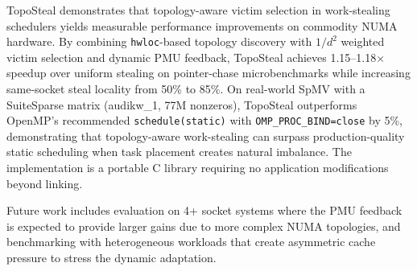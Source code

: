 \documentclass[conference]{IEEEtran}
\begin{document}
TopoSteal demonstrates that topology-aware victim selection in work-stealing schedulers yields measurable performance improvements on commodity NUMA hardware. By combining \texttt{hwloc}-based topology discovery with $1/d^2$ weighted victim selection and dynamic PMU feedback, TopoSteal achieves 1.15--1.18$\times$ speedup over uniform stealing on pointer-chase microbenchmarks while increasing same-socket steal locality from 50\% to 85\%. On real-world SpMV with a SuiteSparse matrix (audikw\_1, 77M nonzeros), TopoSteal outperforms OpenMP's recommended \texttt{schedule(static)} with \texttt{OMP\_PROC\_BIND=close} by 5\%, demonstrating that topology-aware work-stealing can surpass production-quality static scheduling when task placement creates natural imbalance. The implementation is a portable C library requiring no application modifications beyond linking.

Future work includes evaluation on 4+ socket systems where the PMU feedback is expected to provide larger gains due to more complex NUMA topologies, and benchmarking with heterogeneous workloads that create asymmetric cache pressure to stress the dynamic adaptation.


\end{document}
